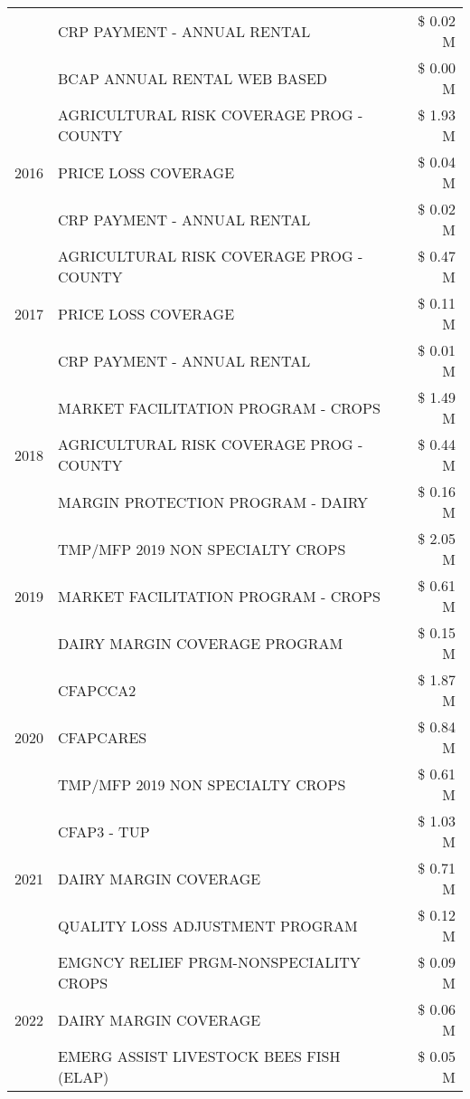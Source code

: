\begin{tabular}{llr}
 & CRP PAYMENT - ANNUAL RENTAL & \$ 0.02 M \\
 & BCAP ANNUAL RENTAL WEB BASED & \$ 0.00 M \\
\cline{1-3}
\multirow[t]{3}{*}{2016} & AGRICULTURAL RISK COVERAGE PROG - COUNTY & \$ 1.93 M \\
 & PRICE LOSS COVERAGE & \$ 0.04 M \\
 & CRP PAYMENT - ANNUAL RENTAL & \$ 0.02 M \\
\cline{1-3}
\multirow[t]{3}{*}{2017} & AGRICULTURAL RISK COVERAGE PROG - COUNTY & \$ 0.47 M \\
 & PRICE LOSS COVERAGE & \$ 0.11 M \\
 & CRP PAYMENT - ANNUAL RENTAL & \$ 0.01 M \\
\cline{1-3}
\multirow[t]{3}{*}{2018} & MARKET FACILITATION PROGRAM - CROPS & \$ 1.49 M \\
 & AGRICULTURAL RISK COVERAGE PROG - COUNTY & \$ 0.44 M \\
 & MARGIN PROTECTION PROGRAM - DAIRY & \$ 0.16 M \\
\cline{1-3}
\multirow[t]{3}{*}{2019} & TMP/MFP 2019 NON SPECIALTY CROPS & \$ 2.05 M \\
 & MARKET FACILITATION PROGRAM - CROPS & \$ 0.61 M \\
 & DAIRY MARGIN COVERAGE PROGRAM & \$ 0.15 M \\
\cline{1-3}
\multirow[t]{3}{*}{2020} & CFAPCCA2 & \$ 1.87 M \\
 & CFAPCARES & \$ 0.84 M \\
 & TMP/MFP 2019 NON SPECIALTY CROPS & \$ 0.61 M \\
\cline{1-3}
\multirow[t]{3}{*}{2021} & CFAP3 - TUP & \$ 1.03 M \\
 & DAIRY MARGIN COVERAGE & \$ 0.71 M \\
 & QUALITY LOSS ADJUSTMENT PROGRAM & \$ 0.12 M \\
\cline{1-3}
\multirow[t]{3}{*}{2022} & EMGNCY RELIEF PRGM-NONSPECIALITY CROPS & \$ 0.09 M \\
 & DAIRY MARGIN COVERAGE & \$ 0.06 M \\
 & EMERG ASSIST LIVESTOCK BEES FISH (ELAP) & \$ 0.05 M \\
\cline{1-3}
\bottomrule
\end{tabular}
